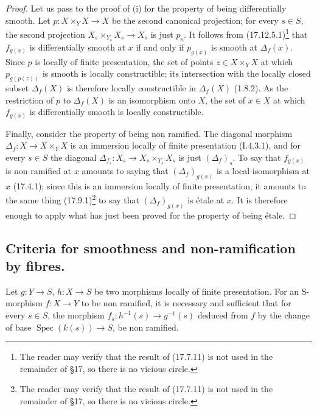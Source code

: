 \begin{proof}
Let us pass to the proof of (i) for the property of being differentially smooth.
Let $p:X\times_Y X\to X$ be the second canonical projection; for every $s\in S$, the second projection $X_s\times_{Y_s}X_s\to X_s$ is just $p_s$.
It follows from (17.12.5.1)\footnote{The reader may verify that the result of (17.7.11) is not used in the remainder of \S17, so there is no vicious circle.} that $f_{g(x)}$ is differentially smooth at $x$ if and only if $p_{g(x)}$ is smooth at $\Delta_f(x)$.
Since $p$ is locally of finite presentation, the set of points $z\in X\times_Y X$ at which $p_{g(p(z))}$ is smooth is locally constructible; its intersection with the locally closed subset $\Delta_f(X)$ is therefore locally constructible in $\Delta_f(X)$ (1.8.2).
As the restriction of $p$ to $\Delta_f(X)$ is an isomorphism onto $X$, the set of $x\in X$ at which $f_{g(x)}$ is differentially smooth is locally constructible.

Finally, consider the property of being non ramified.
The diagonal morphism $\Delta_f:X\to X\times_Y X$ is an immersion locally of finite presentation (I.4.3.1), and for every $s\in S$ the diagonal $\Delta_{f_s}:X_s\to X_s\times_{Y_s}X_s$ is just $(\Delta_f)_s$.
To say that $f_{g(x)}$ is non ramified at $x$ amounts to saying that $(\Delta_f)_{g(x)}$ is a local isomorphism at $x$ (17.4.1); since this is an immersion locally of finite presentation, it amounts to the same thing (17.9.1)\footnote{The reader may verify that the result of (17.7.11) is not used in the remainder of \S17, so there is no vicious circle.} to say that $(\Delta_f)_{g(x)}$ is \'etale at $x$.
It is therefore enough to apply what has just been proved for the property of being \'etale.
\end{proof}


\subsection{Criteria for smoothness and non-ramification by fibres.}
\label{subsection:IV.17.8}


\begin{proposition}[17.8.1]
\label{IV.17.8.1}
Let $g:Y\to S$, $h:X\to S$ be two morphisms locally of finite presentation.
For an S-morphism $f:X\to Y$ to be non ramified, it is necessary and sufficient that for every $s\in S$, the morphism $f_s:h^{-1}(s)\to g^{-1}(s)$ deduced from $f$ by the change of base $\operatorname{Spec}(k(s))\to S$, be non ramified.
\end{proposition}

